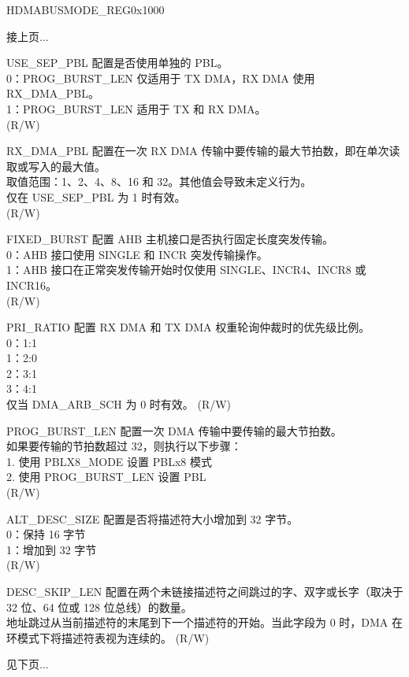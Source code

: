 \addtocounter{Regfloat}{-1}
\begin{register}{H}{DMABUSMODE\_REG}{0x1000}
\begin{regdesc}\begin{reglist}
\item [接上页...]

\item [USE\_SEP\_PBL] 配置是否使用单独的 PBL。\\
0：PROG\_BURST\_LEN 仅适用于 TX DMA，RX DMA 使用 RX\_DMA\_PBL。\\
1：PROG\_BURST\_LEN 适用于 TX 和 RX DMA。\\(R/W)
\item [RX\_DMA\_PBL] 配置在一次 RX DMA 传输中要传输的最大节拍数，即在单次读取或写入的最大值。\\
取值范围：1、2、4、8、16 和 32。其他值会导致未定义行为。\\
仅在 USE\_SEP\_PBL 为 1 时有效。\\
(R/W)
\item [FIXED\_BURST] 配置 AHB 主机接口是否执行固定长度突发传输。\\
0：AHB 接口使用 SINGLE 和 INCR 突发传输操作。\\
1：AHB 接口在正常突发传输开始时仅使用 SINGLE、INCR4、INCR8 或 INCR16。\\ (R/W)
\item [PRI\_RATIO] 配置 RX DMA 和 TX DMA 权重轮询仲裁时的优先级比例。\\
0：1:1\\
1：2:0\\
2：3:1\\
3：4:1\\
仅当 DMA\_ARB\_SCH 为 0 时有效。 (R/W)
\item [PROG\_BURST\_LEN]
配置一次 DMA 传输中要传输的最大节拍数。\\
如果要传输的节拍数超过 32，则执行以下步骤：\\
1. 使用 PBLX8\_MODE 设置 PBLx8 模式\\
2. 使用 PROG\_BURST\_LEN 设置 PBL\\(R/W)
\item [ALT\_DESC\_SIZE] 配置是否将描述符大小增加到 32 字节。\\
0：保持 16 字节\\
1：增加到 32 字节\\(R/W)
\item [DESC\_SKIP\_LEN] 配置在两个未链接描述符之间跳过的字、双字或长字（取决于 32 位、64 位或 128 位总线）的数量。\\地址跳过从当前描述符的末尾到下一个描述符的开始。当此字段为 0 时，DMA 在环模式下将描述符表视为连续的。 (R/W)

\item [见下页...]
\end{reglist}\end{regdesc}
\end{register}

